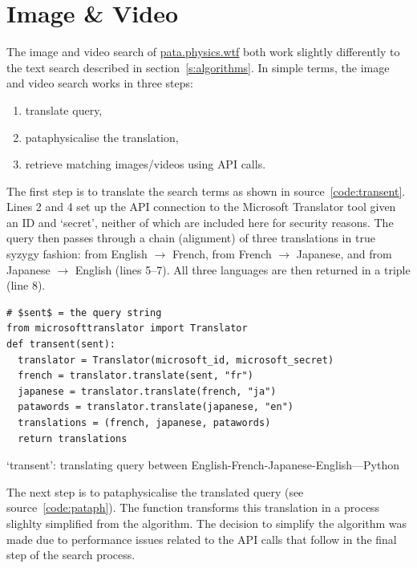 \section{Image \& Video}
\label{s:imgvid}

The image and video search of \url{pata.physics.wtf} both work slightly differently to the text search described in section~\ref{s:algorithms}. In simple terms, the image and video search works in three steps:

\begin{enumerate}
  \item translate query,
  \item pataphysicalise the translation,
  \item retrieve matching images/videos using \ac{API} calls.
\end{enumerate}

The first step is to translate the search terms as shown in source~\ref{code:transent}. Lines 2 and 4 set up the \ac{API} connection to the Microsoft Translator tool \autocite{TranslatorAPI} given an ID and `secret', neither of which are included here for security reasons. The query  then passes through a chain (alignment) of three translations in true syzygy fashion: from English $\to$ French, from French $\to$ Japanese, and from Japanese $\to$ English (lines 5--7). All three languages are then returned in a triple (line 8).

\begin{listing}[!htbp] %
  \begin{verbatim}
# $sent$ = the query string
from microsofttranslator import Translator
def transent(sent):
  translator = Translator(microsoft_id, microsoft_secret)
  french = translator.translate(sent, "fr")
  japanese = translator.translate(french, "ja")
  patawords = translator.translate(japanese, "en")
  translations = (french, japanese, patawords)
  return translations
  \end{verbatim}
\caption[`transent' function---Python]{`transent': translating query between English-French-Japanese-English---Python}
\label{code:transent}
\end{listing}

The next step is to pataphysicalise the translated query (see source~\ref{code:pataph}). The  function transforms this translation in a process slighlty simplified from the  algorithm. The decision to simplify the algorithm was made due to performance issues related to the \ac{API} calls that follow in the final step of the search process. 

